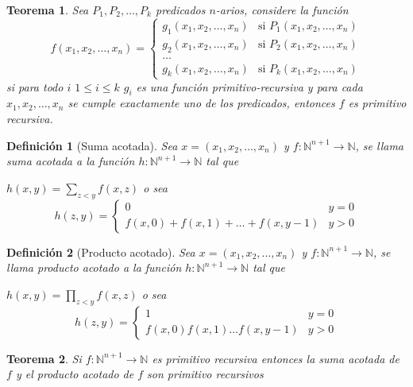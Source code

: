 \documentclass[a4paper,1pt]{report}
\newtheorem*{teo}{Teorema}
\newtheorem*{dfn}{Definición}
\begin{document}
\begin{teo}
 Sea $P_1,P_2,\dots,P_k$ predicados $n$-arios, considere la función
 \begin{equation}
f(x_1,x_2,\dots,x_n) = 
\begin{cases}
g_1(x_1,x_2,\dots,x_n) & \text{si } P_1(x_1,x_2,\dots,x_n) \\
g_2(x_1,x_2,\dots,x_n) & \text{si } P_2(x_1,x_2,\dots,x_n) \\
\dots\\
g_k(x_1,x_2,\dots,x_n) & \text{si } P_k(x_1,x_2,\dots,x_n) 
\end{cases}
\end{equation}
 si para todo $i$ $1\leq i \leq k$ $g_i$ es una función primitivo-recursiva y para cada $x_1,x_2,\dots,x_n$ se cumple exactamente uno de los predicados, entonces $f$ es primitivo recursiva.
\end{teo}

\begin{dfn}[Suma acotada]
 Sea $x=(x_1,x_2,\dots,x_n)$ y $f:\mathbb{N}^{n+1}\rightarrow\mathbb{N}$, se llama suma acotada a la función $h:\mathbb{N}^{n+1}\rightarrow\mathbb{N}$ tal que 
 
 $h(x,y)=\sum_{z<y}f(x,z)$ o sea
 \begin{equation}
h(z,y) = 
\begin{cases}
0 & y=0 \\
f(x,0) + f(x,1) + \dots + f(x,y-1) & y>0 
\end{cases}
\end{equation}
\end{dfn}

\begin{dfn}[Producto acotado]
 Sea $x=(x_1,x_2,\dots,x_n)$ y $f:\mathbb{N}^{n+1}\rightarrow\mathbb{N}$, se llama producto acotado a la función $h:\mathbb{N}^{n+1}\rightarrow\mathbb{N}$ tal que 
 
 $h(x,y)=\prod_{z<y}f(x,z)$ o sea
 \begin{equation}
h(z,y) = 
\begin{cases}
1 & y=0 \\
f(x,0)f(x,1)\dots f(x,y-1) & y>0 
\end{cases}
\end{equation}
\end{dfn}

\begin{teo}
 Si $f:\mathbb{N}^{n+1}\rightarrow\mathbb{N}$ es primitivo recursiva entonces la suma acotada de $f$ y el producto acotado de $f$ son primitivo recursivos
\end{teo}
\end{document}
